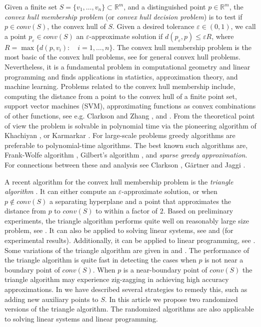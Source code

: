 \documentclass{article}
\theoremstyle{definition}
\begin{document}
Given a finite set $S= \{v_1, \dots, v_n\} \subset \mathbb{R} ^m$, and a distinguished point $p \in \mathbb{R} ^m$, the {\it convex hull membership problem} (or {\it convex hull decision problem}) is to test if $p \in conv(S)$, the convex hull of $S$. Given a desired tolerance $\varepsilon \in (0,1)$, we call a point $p_\varepsilon \in conv(S)$ an $\varepsilon$-approximate solution if $d(p_\varepsilon,p) \leq \varepsilon R$, where $R= \max \{d(p,v_i): \quad i=1, \dots, n\}$. The convex hull membership problem is the most basic of the convex hull problems, see \cite{Goodman} for general convex hull problems. Nevertheless, it is a fundamental problem in computational geometry and linear programming and finds applications in statistics, approximation theory, and machine learning. Problems related to the convex hull membership include, computing the distance from a point to the convex hull of a finite point set,
support vector machines (SVM), approximating functions as convex combinations of other functions, see e.g. Clarkson \cite{clark2008} and Zhang \cite{zhang}, and \cite{kal14}. From the theoretical point of view the problem is solvable in polynomial time via the pioneering algorithm of Khachiyan  \cite{kha79}, or  Karmarkar \cite{kar84}.  For  large-scale problems greedy algorithms are preferable to polynomial-time algorithms. The best known such algorithms are, Frank-Wolfe algorithm \cite{Frank}, Gilbert's algorithm \cite{Gilbert}, and {\it sparse greedy approximation}. For connections between these and analysis  see  Clarkson \cite{clark2008},  G{\"a}rtner and Jaggi \cite{Gartner}.

A recent algorithm for the convex hull membership  problem is the {\it triangle algorithm} \cite{kal14}. It can either compute an $\varepsilon$-approximate solution, or when $p \not \in conv(S)$ a separating hyperplane and a point that approximates the distance from $p$ to $conv(S)$ to within a factor of $2$.
Based on preliminary experiments, the triangle algorithm performs quite well on reasonably large size problem, see \cite{Meng}. It can also be applied to solving linear systems, see \cite{kal12a} and \cite{Gibson} (for experimental results). Additionally, it can be applied to linear programming, see \cite{kal14}. Some variations of the triangle algorithm are given in \cite{kal12a} and \cite{kalSaks}.  The performance of the triangle algorithm is quite fast in detecting the cases when $p$ is not near a boundary point of $conv(S)$.  When $p$ is a near-boundary point of $conv(S)$ the triangle algorithm  may experience zig-zagging in achieving high accuracy approximations.  In \cite{kal14} we have described several strategies to remedy this, such as adding new auxiliary points to $S$.  In this article  we propose two randomized versions of the triangle algorithm. The  randomized algorithms are also applicable to solving linear systems and linear programming.
\end{document}
